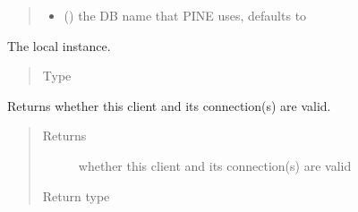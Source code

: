 \documentclass[letterpaper,10pt,english]{sphinxmanual}
\begin{document}
\begin{fulllineitems}
\begin{quote}
\begin{description}
\begin{itemize}
\item {} 
 (\sphinxstyleliteralemphasis{\sphinxupquote{, }}) \textendash{} the DB name that PINE uses, defaults to 

\end{itemize}

\end{description}\end{quote}

\begin{fulllineitems}
\label{\detokenize{autoapi/pine/client/client/index:pine.client.client.LocalPineClient.eve}}
The local {\hyperref[\detokenize{autoapi/pine/client/client/index:pine.client.client.EveClient}]{}} instance.
\begin{quote}\begin{description}
\item[{Type}] \leavevmode
{\hyperref[\detokenize{autoapi/pine/client/client/index:pine.client.client.EveClient}]{}}

\end{description}\end{quote}

\end{fulllineitems}


\begin{fulllineitems}
\label{\detokenize{autoapi/pine/client/client/index:pine.client.client.LocalPineClient.is_valid}}
Returns whether this client and its connection(s) are valid.
\begin{quote}\begin{description}
\item[{Returns}] \leavevmode
whether this client and its connection(s) are valid

\item[{Return type}] \leavevmode
{}

\end{description}\end{quote}

\end{fulllineitems}


\end{fulllineitems}
\end{document}

